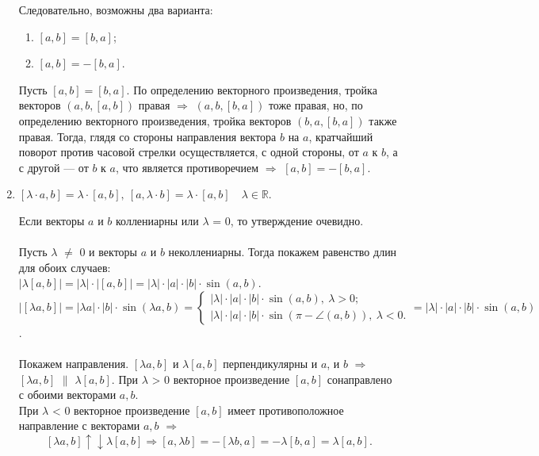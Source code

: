 \begin{enumerate}
\begin{Proof}
\begin{center}
		\end{center}
		Следовательно, возможны два варианта:
		\begin{enumerate}
			\item $[a, b] = [b, a]$;
			\item $[a, b] = -[b, a]$.
		\end{enumerate}
		Пусть $[a, b] = [b, a]$. По определению векторного произведения, тройка векторов $(a, b, [a, b])$ правая $\Rightarrow$ $(a, b, [b, a])$ тоже правая, но, по определению векторного произведения, тройка векторов $(b, a, [b, a])$ также правая. Тогда, глядя со стороны направления вектора $b$ на $a$, кратчайший поворот против часовой стрелки осуществляется, с одной стороны, от $a$ к $b$, а с другой --- от $b$ к $a$, что является противоречием $\Rightarrow$ $[a, b] = -[b, a]$.
	\end{Proof}
	\item $[\lambda\cdot a, b] = \lambda\cdot[a, b],\ [a, \lambda\cdot b] = \lambda\cdot[a, b]\quad \lambda \in \mathbb{R}.$
	\begin{Proof}
		Если векторы $a$ и $b$ коллениарны или $\lambda$ = 0, то утверждение очевидно.\\\\
		Пусть $\lambda$ $\not=$ 0 и векторы $a$ и $b$ неколлениарны. Тогда покажем равенство длин для обоих случаев:\\
		$|\lambda[a, b]| = |\lambda|\cdot|[a, b]| = |\lambda|\cdot|a|\cdot|b|\cdot \sin(a, b)$. \\
		$|[\lambda a, b]| = |\lambda a|\cdot|b|\cdot \sin(\lambda a, b) = \begin{cases} |\lambda|\cdot|a|\cdot|b|\cdot \sin (a, b),\ \lambda > 0; \\  |\lambda|\cdot|a|\cdot|b|\cdot \sin (\pi - \angle (a, b)),\ \lambda < 0.\end{cases} = |\lambda|\cdot|a|\cdot|b|\cdot \sin (a, b)$. \\\\
		Покажем направления.
		$[\lambda a, b]$ и $\lambda[a, b]$ перпендикулярны и $a$, и $b$ $\Rightarrow$ $[\lambda a, b]$ $\parallel$ $\lambda[a, b]$. При $\lambda$ > 0 векторное произведение $[a, b]$ сонаправлено с обоими векторами $a, b$. \\
		При $\lambda$ < 0 векторное произведение $[a, b]$ имеет противоположное направление с векторами $a, b$ $\Rightarrow$ \\ $$[\lambda a, b]\uparrow\downarrow\lambda[a, b]\Rightarrow[a, \lambda b] = -[\lambda b, a] = -\lambda [b, a] = \lambda [a, b].$$

\end{Proof}
\end{enumerate}
